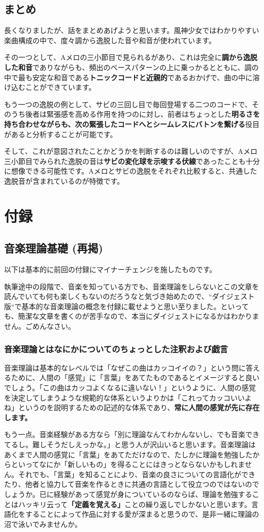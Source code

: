 \documentclass[11pt]{ltjarticle}
\newcommand{\wc}{\writechord}
\begin{document}
\subsection{まとめ}
長くなりましたが、話をまとめあげようと思います。風神少女ではわかりやすい楽曲構成の中で、度々調から逸脱した音や和音が使われています。\par
その一つとして、Aメロの三小節目で見られる\wc{Dm}があり、これは完全に\textbf{調から逸脱した和音}でありながらも、頻出のベースパターンの上に乗っかるとともに、調の中で最も安定な和音である\textbf{トニックコード\wc{Fm}と近親的}であるおかげで、曲の中に溶け込むことができています。\par
もう一つの逸脱の例として、サビの三回し目で毎回登場する二つのコードで、そのうち後者は緊張感を高める作用を持つのに対し、前者はちょっとした\textbf{明るさを持ち合わせながらも、次の緊張したコードへとシームレスにバトンを繋げる}役目があると分析することが可能です。\par
そして、これが意図されたことかどうかを判断するのは難しいのですが、Aメロ三小節目でみられた逸脱の音は\textbf{サビの変化球を示唆する伏線}であったことも十分に想像できる可能性です。Aメロとサビの逸脱をそれぞれ比較すると、共通した逸脱音が含まれているのが特徴です。
\section{付録}
\subsection{音楽理論基礎 (再掲)}
以下は基本的に前回の付録にマイナーチェンジを施したものです。\par 
執筆途中の段階で、音楽を知っている方でも、音楽理論をしらないとこの文章を読んでいても何も楽しくもないのだろうなと気づき始めたので、“ダイジェスト版“で基本的な音楽理論の概念を付録に載せようと思い至りました。といっても、簡潔な文章を書くのが苦手なので、本当にダイジェストになるかはわかりません。ごめんなさい。
\subsubsection{音楽理論とはなにかについてのちょっとした注釈および戯言}
音楽理論は基本的なレベルでは「なぜこの曲はカッコイイの？」という問に答えるために、人間の「感覚」に「言葉」をあてたものであるとイメージすると良いでしょう。「この曲はカッコよくなるに違いない！」というように、人間の感覚を決定してしまうような規範的な体系というよりかは「これってカッコいいよね」というのを説明するための記述的な体系であり、\textbf{常に人間の感覚が先に存在します。}\par
もう一点。音楽経験がある方なら「別に理論なんてわかんないし、でも音楽できてるし。難しそうだしえっかな。」と思う人が沢山いると思います。音楽理論はあくまで人間の感覚に「言葉」をあてただけなので、たしかに理論を勉強したからといってなにか「新しいもの」を得ることにはきっとならないかもしれません。それでも、「言葉」を知ることにより、音楽の良さについての言語化ができたり、他者と協力して音楽を作るときに共通の言語として役立つのではないのでしょうか。已に経験があって感覚が身についているのならば、理論を勉強することはハッキリ云って\textbf{「定義を覚える」}ことの繰り返しでしかないと思います。言語化をすることによって作品に対する愛が深まると思うので、是非一緒に理論の沼で泳いでみませんか。
\end{document}
